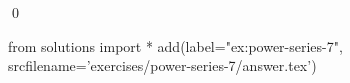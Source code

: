\begin{ex}
  \label{ex:power-series-7}
  
  \qed
\end{ex}
\begin{python0}
from solutions import *
add(label="ex:power-series-7",
    srcfilename='exercises/power-series-7/answer.tex') 
\end{python0}                              
